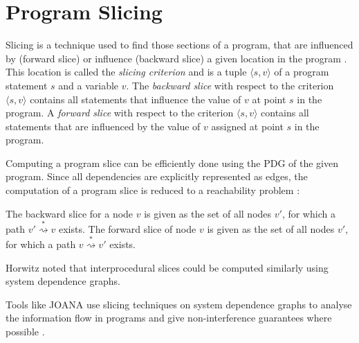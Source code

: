 \section{Program Slicing}


Slicing is a technique used to find those sections of a program, that are influenced by (forward slice) or influence (backward slice) a given location in the program \cite{weiser81}.
This location is called the \emph{slicing criterion} and is a tuple $\langle s, v \rangle$ of a program statement $s$ and a variable $v$.
The \emph{backward slice} with respect to the criterion $\langle s, v \rangle$ contains all statements that influence the value of $v$ at point $s$ in the program. 
A \emph{forward slice} with respect to the criterion $\langle s, v \rangle$ contains all statements that are influenced by the value of $v$ assigned at point $s$ in the program.

Computing a program slice can be efficiently done using the PDG of the given program. Since all dependencies are explicitly represented as edges, the computation of a program slice is reduced to a reachability problem \cite{ottenstein84}: 

The backward slice for a node $v$ is given as the set of all nodes $v'$, for which a path $v' \stackrel{*}{\rightsquigarrow} v$ exists. The forward slice of node $v$ is given as the set of all nodes $v'$, for which a path $v \stackrel{*}{\rightsquigarrow} v'$ exists.

Horwitz \cite{horwitz88sdg} noted that interprocedural slices could be computed similarly using system dependence graphs.

Tools like JOANA use slicing techniques on system dependence graphs to analyse the information flow in programs and give non-interference guarantees where possible \cite{hammer09}.


